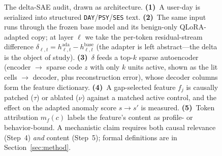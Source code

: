 \begin{figure}[t]
{\begin{tikzpicture}
\end{tikzpicture}}%
\caption{The delta-SAE audit, drawn as architecture.
\textbf{(1)}~A user-day is serialized into structured
\texttt{DAY}/\texttt{PSY}/\texttt{SES} text.
\textbf{(2)}~The same input runs through the frozen base model and its
benign-only QLoRA-adapted copy; at layer $\ell$ we take the per-token
residual-stream difference
$\delta_{\ell,t}=h^{\mathrm{ada}}_{\ell,t}-h^{\mathrm{base}}_{\ell,t}$
(the adapter is left abstract---the delta is the object of study).
\textbf{(3)}~$\delta$ feeds a top-$k$ sparse autoencoder (encoder $\to$ sparse
code $z$ with only $k$ units active, shown as the lit cells $\to$ decoder,
plus reconstruction error), whose decoder columns form the feature dictionary.
\textbf{(4)}~A gap-selected feature $f_j$ is causally patched ($\tau$) or
ablated ($\nu$) against a matched active control, and the effect on the adapted
anomaly score $s\!\to\!s'$ is measured.
\textbf{(5)}~Token attribution $m_f(c)$ labels the feature's content as
profile- or behavior-bound. A mechanistic claim requires both causal relevance
(Step~4) \emph{and} content (Step~5); formal definitions are in Section~\ref{sec:method}.}
\label{fig:architecture}
\end{figure}
